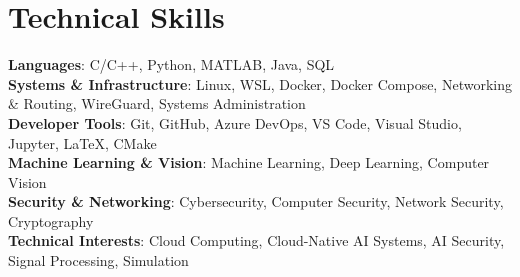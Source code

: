 \section{Technical Skills}
\begin{itemize}[leftmargin=0.15in, label={}]
\small{\item{
    \textbf{Languages}{: C/C++, Python, MATLAB, Java, SQL} \\
    \textbf{Systems \& Infrastructure}{: Linux, WSL, Docker, Docker Compose, Networking \& Routing, WireGuard, Systems Administration} \\
    \textbf{Developer Tools}{: Git, GitHub, Azure DevOps, VS Code, Visual Studio, Jupyter, LaTeX, CMake} \\
    \textbf{Machine Learning \& Vision}{: Machine Learning, Deep Learning, Computer Vision} \\
    \textbf{Security \& Networking}{: Cybersecurity, Computer Security, Network Security, Cryptography} \\
    \textbf{Technical Interests}{: Cloud Computing, Cloud-Native AI Systems, AI Security, Signal Processing, Simulation}
}}
\end{itemize}
